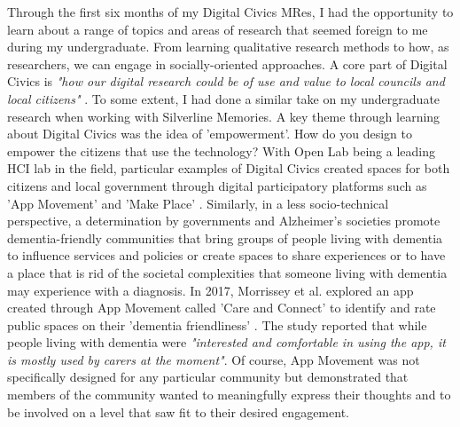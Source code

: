 Through the first six months of my Digital Civics MRes, I had the opportunity to learn about a range of topics and areas of research that seemed foreign to me during my undergraduate. From learning qualitative research methods to how, as researchers, we can engage in socially-oriented approaches. A core part of Digital Civics is \textit{"how our digital research could be of use and value to local councils and local citizens"} \citep{olivier_digital_2015}. To some extent, I had done a similar take on my undergraduate research when working with Silverline Memories. A key theme through learning about Digital Civics was the idea of 'empowerment'. How do you design to empower the citizens that use the technology? With Open Lab being a leading HCI lab in the field, particular examples of Digital Civics created spaces for both citizens and local government through digital participatory platforms such as 'App Movement' \citep{garbett_app_2016} and 'Make Place' \citep{peacock_streets_2018}. Similarly, in a less socio-technical perspective, a determination by governments and Alzheimer's societies promote dementia-friendly communities that bring groups of people living with dementia to influence services and policies or create spaces to share experiences or to have a place that is rid of the societal complexities that someone living with dementia may experience with a diagnosis. In 2017, Morrissey et al. explored an app created through App Movement called 'Care and Connect' to identify and rate public spaces on their 'dementia friendliness' \citep{morrissey_care_2017}. The study reported that while people living with dementia were \textit{"interested and comfortable in using the app, it is mostly used by carers at the moment"}. Of course, App Movement was not specifically designed for any particular community but demonstrated that members of the community wanted to meaningfully express their thoughts and to be involved on a level that saw fit to their desired engagement.

